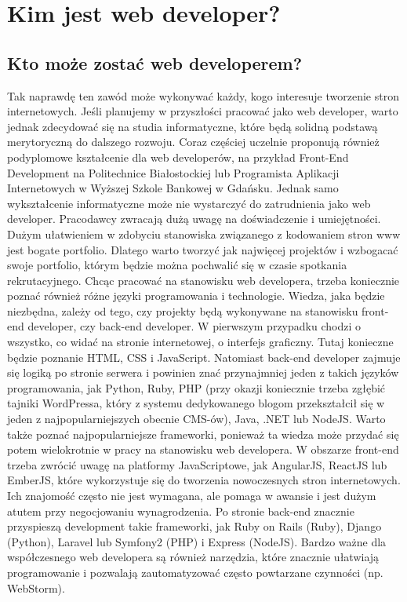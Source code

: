 \documentclass[12pt]{report}
\begin{document}
	\newpage
	\chapter{Kim jest web developer?}
	\section{Kto może zostać web developerem?}
	Tak naprawdę ten zawód może wykonywać każdy, kogo interesuje tworzenie stron internetowych. Jeśli planujemy w przyszłości pracować jako web developer, warto jednak zdecydować się na studia informatyczne, które będą solidną podstawą merytoryczną do dalszego rozwoju. Coraz częściej uczelnie proponują również podyplomowe kształcenie dla web developerów, na przykład Front-End Development na Politechnice Białostockiej lub Programista Aplikacji Internetowych w Wyższej Szkole Bankowej w Gdańsku. Jednak samo wykształcenie informatyczne może nie wystarczyć do zatrudnienia jako web developer. Pracodawcy zwracają dużą uwagę na doświadczenie i umiejętności. Dużym ułatwieniem w zdobyciu stanowiska związanego z kodowaniem stron www jest bogate portfolio. Dlatego warto tworzyć jak najwięcej projektów i wzbogacać swoje portfolio, którym będzie można pochwalić się w czasie spotkania rekrutacyjnego.
	\newpage
	Chcąc pracować na stanowisku web developera, trzeba koniecznie poznać również różne języki programowania i technologie. Wiedza, jaka będzie niezbędna, zależy od tego, czy projekty będą wykonywane na stanowisku front-end developer, czy back-end developer. W pierwszym przypadku chodzi o wszystko, co widać na stronie internetowej, o interfejs graficzny. Tutaj konieczne będzie poznanie HTML, CSS i JavaScript. Natomiast back-end developer zajmuje się logiką po stronie serwera i powinien znać przynajmniej jeden z takich języków programowania, jak Python, Ruby, PHP (przy okazji koniecznie trzeba zgłębić tajniki WordPressa, który z systemu dedykowanego blogom przekształcił się w jeden z najpopularniejszych obecnie CMS-ów), Java, .NET lub NodeJS. Warto także poznać najpopularniejsze frameworki, ponieważ ta wiedza może przydać się potem wielokrotnie w pracy na stanowisku web developera. W obszarze front-end trzeba zwrócić uwagę na platformy JavaScriptowe, jak AngularJS, ReactJS lub EmberJS, które wykorzystuje się do tworzenia nowoczesnych stron internetowych. Ich znajomość często nie jest wymagana, ale pomaga w awansie i jest dużym atutem przy negocjowaniu wynagrodzenia. Po stronie back-end znacznie przyspieszą development takie frameworki, jak Ruby on Rails (Ruby), Django (Python), Laravel lub Symfony2 (PHP) i Express (NodeJS). Bardzo ważne dla współczesnego web developera są również narzędzia, które znacznie ułatwiają programowanie i pozwalają zautomatyzować często powtarzane czynności (np. WebStorm).
	\cite{webd}
	
\end{document}
